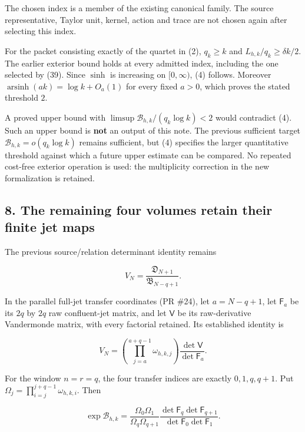 \documentclass[11pt,a4paper]{article}
\begin{document}
The chosen index is a member of the existing canonical family. The source representative, Taylor unit, kernel, action and trace are not chosen again after selecting this index.

For the packet consisting exactly of the quartet in (2), \(q_k\ge k\) and \(L_{h,k}/q_k\ge\delta k/2\). The earlier exterior bound holds at every admitted index, including the one selected by (39). Since \(\sinh\) is increasing on \([0,\infty)\), (4) follows. Moreover \(\operatorname{arsinh}(ak)=\log k+O_a(1)\) for every fixed \(a>0\), which proves the stated threshold \(2\).

A proved upper bound with \(\limsup\mathcal B_{h,k}/(q_k\log k)<2\) would contradict (4). Such an upper bound is \textbf{not} an output of this note. The previous sufficient target \(\mathcal B_{h,k}=o(q_k\log k)\) remains sufficient, but (4) specifies the larger quantitative threshold against which a future upper estimate can be compared. No repeated cost-free exterior operation is used: the multiplicity correction in the new formalization is retained.

\subsection{8. The remaining four volumes retain their finite jet maps}\label{zlm:endpoint-arithmetic_original--the-remaining-four-volumes-retain-their-finite-jet-maps}

The previous source/relation determinant identity remains

\[
 V_N=\frac{\mathfrak D_{N+1}}{\mathfrak B_{N-q+1}}.
                                                                         \tag{40}
\]

In the parallel full-jet transfer coordinates (PR \#24), let \(a=N-q+1\), let \(\mathsf F_a\) be its \(2q\) by \(2q\) raw confluent-jet matrix, and let \(\mathsf V\) be its raw-derivative Vandermonde matrix, with every factorial retained. Its established identity is

\[
 V_N=\left(\prod_{j=a}^{a+q-1}\omega_{h,k,j}\right)
                       \frac{\det\mathsf V}{\det\mathsf F_a}.           \tag{41}
\]

For the window \(n=r=q\), the four transfer indices are exactly \(0,1,q,q+1\). Put \(\Omega_j=\prod_{i=j}^{j+q-1}\omega_{h,k,i}\). Then

\[
 \boxed{
 \exp\mathcal B_{h,k}
 =\frac{\Omega_0\Omega_1}{\Omega_q\Omega_{q+1}}
   \frac{\det\mathsf F_q\det\mathsf F_{q+1}}
        {\det\mathsf F_0\det\mathsf F_1}.
 }                                                                     \tag{42}
\]
\end{document}
